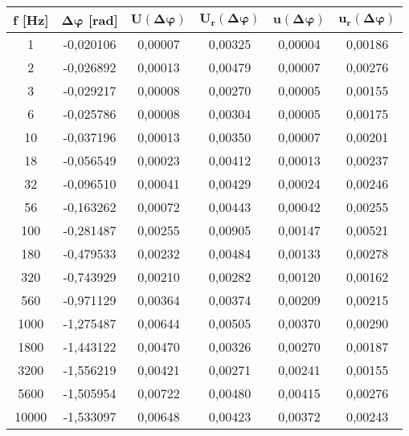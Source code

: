 \begin{table}[!ht]
    \centering
    \begin{tabular}{|c|c|c|c|c|c|}
    \hline
        \textbf{f [Hz]} & $\bm{\Delta\varphi}$ \textbf{[rad]} & $\bm{U(\Delta\varphi)}$ & $\bm{U_r(\Delta\varphi)}$ & $\bm{u(\Delta\varphi)}$ & $\bm{u_r(\Delta\varphi)}$ \\ \hline
        1 & -0,020106 & 0,00007 & 0,00325 & 0,00004 & 0,00186 \\ \hline
        2 & -0,026892 & 0,00013 & 0,00479 & 0,00007 & 0,00276 \\ \hline
        3 & -0,029217 & 0,00008 & 0,00270 & 0,00005 & 0,00155 \\ \hline
        6 & -0,025786 & 0,00008 & 0,00304 & 0,00005 & 0,00175 \\ \hline
        10 & -0,037196 & 0,00013 & 0,00350 & 0,00007 & 0,00201 \\ \hline
        18 & -0,056549 & 0,00023 & 0,00412 & 0,00013 & 0,00237 \\ \hline
        32 & -0,096510 & 0,00041 & 0,00429 & 0,00024 & 0,00246 \\ \hline
        56 & -0,163262 & 0,00072 & 0,00443 & 0,00042 & 0,00255 \\ \hline
        100 & -0,281487 & 0,00255 & 0,00905 & 0,00147 & 0,00521 \\ \hline
        180 & -0,479533 & 0,00232 & 0,00484 & 0,00133 & 0,00278 \\ \hline
        320 & -0,743929 & 0,00210 & 0,00282 & 0,00120 & 0,00162 \\ \hline
        560 & -0,971129 & 0,00364 & 0,00374 & 0,00209 & 0,00215 \\ \hline
        1000 & -1,275487 & 0,00644 & 0,00505 & 0,00370 & 0,00290 \\ \hline
        1800 & -1,443122 & 0,00470 & 0,00326 & 0,00270 & 0,00187 \\ \hline
        3200 & -1,556219 & 0,00421 & 0,00271 & 0,00241 & 0,00155 \\ \hline
        5600 & -1,505954 & 0,00722 & 0,00480 & 0,00415 & 0,00276 \\ \hline
        10000 & -1,533097 & 0,00648 & 0,00423 & 0,00372 & 0,00243 \\ \hline
    \end{tabular}
\end{table}
\FloatBarrier
\clearpage